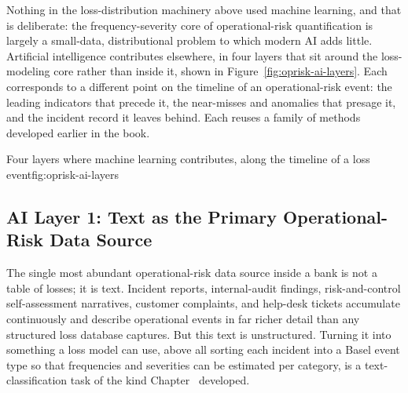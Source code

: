 \documentclass[../ai_in_finance]{subfiles}
\begin{document}
Nothing in the loss-distribution machinery above used machine learning, and that is deliberate: the frequency-severity core of operational-risk quantification is largely a small-data, distributional problem to which modern AI adds little. Artificial intelligence contributes elsewhere, in four layers that sit around the loss-modeling core rather than inside it, shown in Figure~\ref{fig:oprisk-ai-layers}. Each corresponds to a different point on the timeline of an operational-risk event: the leading indicators that precede it, the near-misses and anomalies that presage it, and the incident record it leaves behind. Each reuses a family of methods developed earlier in the book.

\begin{bookfigure}[htbp]{Four layers where machine learning contributes, along the timeline of a loss event}{fig:oprisk-ai-layers}
\end{bookfigure}

\subsection{AI Layer 1: Text as the Primary Operational-Risk Data Source}
\label{sec:oprisk-text}

The single most abundant operational-risk data source inside a bank is not a table of losses; it is text. Incident reports, internal-audit findings, risk-and-control self-assessment narratives, customer complaints, and help-desk tickets accumulate continuously and describe operational events in far richer detail than any structured loss database captures. But this text is unstructured. Turning it into something a loss model can use, above all sorting each incident into a Basel event type so that frequencies and severities can be estimated per category, is a text-classification task of the kind Chapter~ developed.
\end{document}
